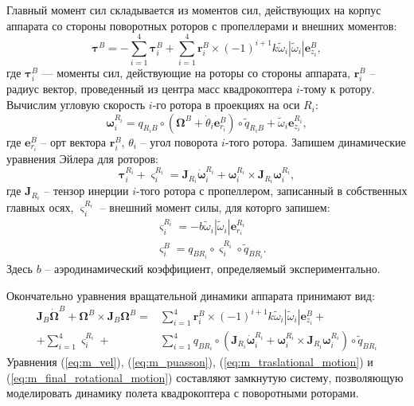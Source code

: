 Главный момент сил складывается из моментов сил, действующих на корпус аппарата со стороны поворотных роторов с пропеллерами и внешних моментов:
\begin{equation} \label{eq:m_general_torq}
\bm{\tau}^{B} =
-\sum_{i=1}^{4} {\bm{\tau}^{B}_i} +
\sum_{i=1}^{4} {\bm{r}^B_i \times (-1)^{i+1} k \tilde \omega_i |\tilde \omega_i| \bm{e}^{B}_{z_i},}
\end{equation}
где $\bm{\tau}^{B}_i$ — моменты сил, действующие на роторы со стороны аппарата, $\bm{r}^B_i$ -- радиус вектор, проведенный из центра масс квадрокоптера $i$-тому к ротору. Вычислим угловую скорость $i$-го ротора в проекциях на оси $R_i$:
\begin{equation} \label{eq:m_prop_ang_vel}
\bm{\omega}^{R_i}_i =
q_{{R_i} B} \circ (\bm{\Omega}^B + \dot {\theta}_i \bm e^B_{r_i}) \circ \tilde {q}_{{R_i}B} +
\tilde \omega_i \bm{e}^{R_i}_{z_i},
\end{equation}
где $\bm e^B_{r_i}$ -- орт вектора $\bm{r}^B_i$, ${\theta}_i$ -- угол поворота $i$-того ротора. Запишем динамические уравнения Эйлера для роторов:
\begin{equation} \label{eq:m_rotors_dyn}
\bm{\tau}^{{R_i}}_i + \bm{\varsigma}^{{R_i}}_{i} = 
\bm{J}_{R_i}\dot{\bm{\omega}}^{R_i}_i + \bm{\omega}^{R_i}_i \times \bm{J}_{R_i}{\bm{\omega}^{R_i}_i},
\end{equation}
где $\bm{J}_{R_i}$ -- тензор инерции $i$-того ротора с пропеллером, записанный в собственных главных осях, $\bm{\varsigma}^{{R_i}}_{i}$ -- внешний момент силы, для которго запишем:
\begin{equation} \label{eq:m_ext_torq}
\begin{aligned}
&\bm{\varsigma}^{{R_i}}_{i} = -b \tilde \omega_i |\tilde \omega_i| \bm e^{R_i}_{r_i}\\
&\bm{\varsigma}^{B}_{i} = q_{ B {R_i}} \circ \bm{\varsigma}^{{R_i}}_{i} \circ \tilde q_{ B {R_i}}.
\end{aligned}
\end{equation}
Здесь $b$ -- аэродинамический коэффициент, определяемый экспериментально.

Окончательно уравнения вращательной динамики аппарата принимают вид:
\begin{equation} \label{eq:m_final_rotational_motion}
\begin{aligned}
\bm{J}_B\dot{\bm{\Omega}}^B + \bm{\Omega}^B \times \bm{J}_B{\bm{\Omega}^B} =
&\sum_{i=1}^{4} {\bm{r}^B_i \times
	(-1)^{i+1} k \tilde \omega_i |\tilde \omega_i| \bm{e}^B_{z_i}} + \\ +
\sum_{i=1}^{4} {\bm{\varsigma}^{{R_i}}_{i}} +
&\sum_{i=1}^{4} q_{ B {R_i}} \circ (\bm{J}_{R_i}\dot{\bm{\omega}}^{R_i}_i + \bm{\omega}^{R_i}_i \times \bm{J}_{R_i}{\bm{\omega}^{R_i}_i}) \circ \tilde q_{ B {R_i}}
\end{aligned}
\end{equation}
Уравнения (\ref{eq:m_vel}), (\ref{eq:m_puasson}), (\ref{eq:m_traslational_motion}) и (\ref{eq:m_final_rotational_motion}) составляют замкнутую систему, позволяющую моделировать динамику полета квадрокоптера с поворотными роторами.

